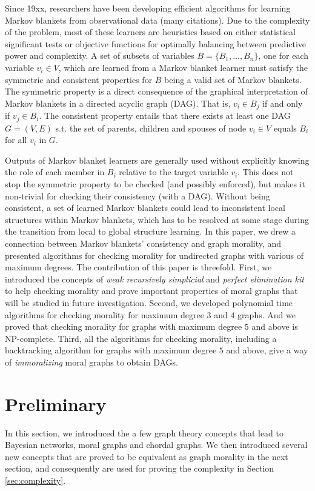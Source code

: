 Since 19xx, researchers have been developing efficient algorithms for learning Markov blankets from observational data (many citations). Due to the complexity of the problem, most of these learners are heuristics based on either statistical significant tests or objective functions for optimally balancing between predictive power and complexity. A set of subsets of variables $B=\{B_1, \dots, B_n\}$, one for each variable $v_i \in V$, which are learned from a Markov blanket learner must satisfy the symmetric and consistent properties for $B$ being a valid set of Markov blankets. The symmetric property is a direct consequence of the graphical interpretation of Markov blankets in a directed acyclic graph (DAG). That is, $v_i \in B_j$ if and only if $v_j \in B_i$. The consistent property entails that there exists at least one DAG $G=(V,E)$ s.t. the set of parents, children and spouses of node $v_i \in V$ equals $B_i$ for all $v_i$ in $G$. 

Outputs of Markov blanket learners are generally used without explicitly knowing the role of each member in $B_i$ relative to the target variable $v_i$. This does not stop the symmetric property to be checked (and possibly enforced), but makes it non-trivial for checking their consistency (with a DAG). Without being consistent, a set of learned Markov blankets could lead to inconsistent local structures within Markov blankets, which has to be resolved at some stage during the transition from local to global structure learning. In this paper, we drew a connection between Markov blankets' consistency and graph morality, and presented algorithms for checking morality for undirected graphs with various of maximum degrees. The contribution of this paper is threefold. First, we introduced the concepts of \textit{weak recursively simplicial} and \textit{perfect elimination kit} to help checking morality and prove important properties of moral graphs that will be studied in future investigation. Second, we developed polynomial time algorithms for checking morality for maximum degree $3$ and $4$ graphs. And we proved that checking morality for graphs with maximum degree $5$ and above is NP-complete. Third, all the algorithms for checking morality, including a backtracking algorithm for graphs with maximum degree $5$ and above, give a way of \textit{immoralizing} moral graphs to obtain DAGs. 


\section{Preliminary} 
In this section, we introduced the a few graph theory concepts that lead to Bayesian networks, moral graphs and chordal graphs. We then introduced several new concepts that are proved to be equivalent as graph morality in the next section, and consequently are used for proving the complexity in Section \ref{sec:complexity}. 

